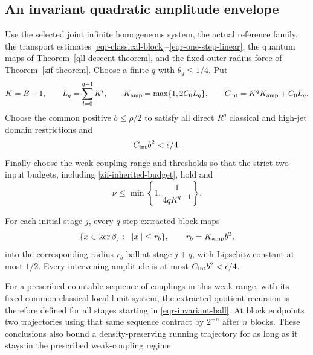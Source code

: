 \subsection{An invariant quadratic amplitude envelope}
\label{eqr-envelope-section}

\begin{theorem}
\label{eqr-envelope-theorem}
Use the selected joint infinite homogeneous system, the actual
reference family, the transport estimates
\eqref{eqr-classical-block}--\eqref{eqr-one-step-linear},
the quantum maps of Theorem~\ref{qll-descent-theorem}, and the
fixed-outer-radius force of Theorem~\ref{zif-theorem}.
Choose a finite $q$ with $\theta_q\le1/4$. Put
\begin{equation}
 K=B+1,\qquad L_q=\sum_{l=0}^{q-1}K^l,\qquad
 K_{\rm amp}=\max\{1,2C_0L_q\},\qquad
 C_{\rm int}=K^qK_{\rm amp}+C_0L_q.
 \label{eqr-envelope-constants}
\end{equation}
Choose the common positive $b\le\rho/2$ to satisfy all direct
$R^q$ classical and high-jet domain restrictions and
\begin{equation}
                  C_{\rm int}b^2<\bar\epsilon/4.
 \label{eqr-inner-radius}
\end{equation}
Finally choose the weak-coupling range and thresholds so that the
strict two-input budgets, including
\eqref{zif-inherited-budget}, hold and
\begin{equation}
             \nu\le\min\left\{1,\frac1{4qK^{q-1}}\right\}.
 \label{eqr-nu-choice}
\end{equation}

For each initial stage $j$, every $q$-step extracted block maps
\begin{equation}
 \{x\in\ker\beta_j:\ \|x\|\le r_b\},
                \qquad r_b=K_{\rm amp}b^2,
 \label{eqr-invariant-ball}
\end{equation}
into the corresponding radius-$r_b$ ball at stage $j+q$, with
Lipschitz constant at most $1/2$. Every intervening amplitude is
at most $C_{\rm int}b^2<\bar\epsilon/4$.

For a prescribed countable sequence of couplings in this weak
range, with its fixed common classical local-limit system,
the extracted quotient recursion is therefore defined for all
stages starting in \eqref{eqr-invariant-ball}. At block endpoints
two trajectories using that same sequence contract by $2^{-n}$
after $n$ blocks. These conclusions also bound a density-preserving
running trajectory for as long as it stays in the prescribed
weak-coupling regime.
\end{theorem}
